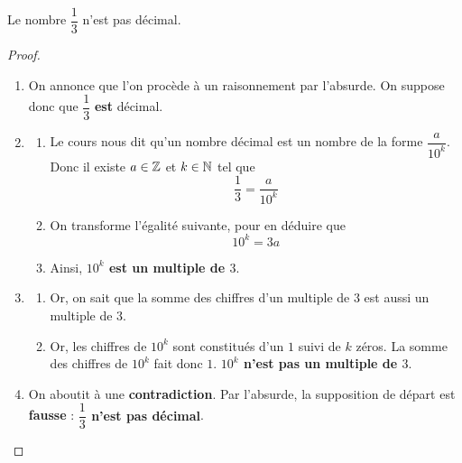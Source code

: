 \documentclass{article}
\begin{document}
\begin{proposition}
Le nombre $\dfrac{1}{3}$ n'est pas décimal.
\end{proposition}
\begin{proof}
\begin{enumerate}
\item On annonce que l'on procède à un raisonnement par l'absurde. On suppose donc que $\dfrac{1}{3}$ \textbf{est} décimal.

\item \begin{enumerate}
\item Le cours nous dit qu'un nombre décimal est un nombre de la forme $\dfrac{a}{10^k}$. Donc il existe $a \in \mathbb{Z}$ et $k \in \mathbb{N}$ tel que
\begin{equation*}
\dfrac{1}{3} = \dfrac{a}{10^k}
\end{equation*}
\item On transforme l'égalité suivante, pour en déduire que
\begin{equation*}
10^k = 3a
\end{equation*}
\item Ainsi, \textbf{$10^k$ est un multiple de $3$}.
\end{enumerate}
\item \begin{enumerate}
\item Or, on sait que la somme des chiffres d'un multiple de $3$ est aussi un multiple de $3$.
\item Or, les chiffres de $10^k$ sont constitués d'un $1$ suivi de $k$ zéros. La somme des chiffres de $10^k$ fait donc $1$. \textbf{$10^k$ n'est pas un multiple de $3$}.
\end{enumerate} 
\item On aboutit à une \textbf{contradiction}. Par l'absurde, la supposition de départ est \textbf{fausse} : \textbf{$\dfrac{1}{3}$ n'est pas décimal}.
\end{enumerate}
\end{proof}
\end{document}
